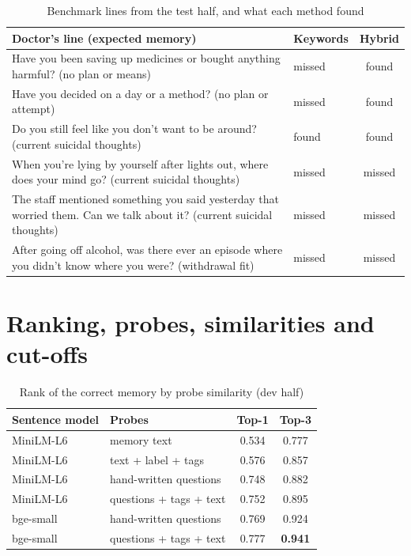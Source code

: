 \documentclass[10pt]{article}
\begin{document}
\begin{table}[htbp]
\caption{Benchmark lines from the test half, and what each method found}
\label{p3:tab:examples}
\centering
\scriptsize
\begin{tabularx}{\linewidth}{@{}Ylc@{}}
\toprule
Doctor's line (expected memory) & Keywords & Hybrid\\
\midrule
Have you been saving up medicines or bought anything harmful? (no plan or means) & missed & found\\
Have you decided on a day or a method? (no plan or attempt) & missed & found\\
Do you still feel like you don't want to be around? (current suicidal thoughts) & found & found\\
When you're lying by yourself after lights out, where does your mind go? (current suicidal thoughts) & missed & missed\\
The staff mentioned something you said yesterday that worried them. Can we talk about it? (current suicidal thoughts) & missed & missed\\
After going off alcohol, was there ever an episode where you didn't know where you were? (withdrawal fit) & missed & missed\\
\bottomrule
\end{tabularx}
\end{table}

\section{Ranking, probes, similarities and cut-offs}\label{s:rank}

\begin{table}[htbp]
\caption{Rank of the correct memory by probe similarity (dev half)}
\label{p3:tab:ablation}
\centering
\footnotesize
\begin{tabular}{@{}llcc@{}}
\toprule
Sentence model & Probes & Top-1 & Top-3\\
\midrule
MiniLM-L6 \cite{wang2020minilm} & memory text & 0.534 & 0.777\\
MiniLM-L6 & text + label + tags & 0.576 & 0.857\\
MiniLM-L6 & hand-written questions & 0.748 & 0.882\\
MiniLM-L6 & questions + tags + text & 0.752 & 0.895\\
bge-small & hand-written questions & 0.769 & 0.924\\
bge-small & questions + tags + text & 0.777 & \textbf{0.941}\\
\bottomrule
\end{tabular}
\end{table}
\end{document}
